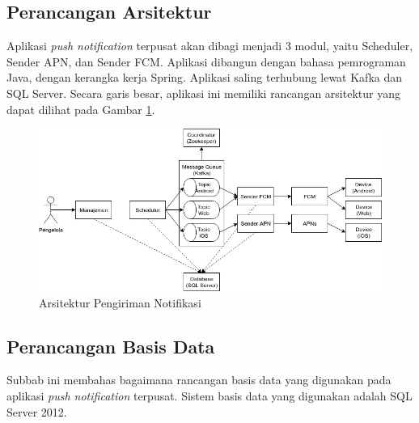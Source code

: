 \subsection{Perancangan Arsitektur} \label{s:perancangan_arsitektur}
\par Aplikasi \textit{push notification} terpusat akan dibagi menjadi 3 modul, yaitu Scheduler,
Sender APN, dan Sender FCM.
Aplikasi dibangun dengan bahasa pemrograman Java, dengan kerangka kerja
Spring.
Aplikasi saling terhubung lewat Kafka dan SQL Server.
Secara garis besar, aplikasi ini memiliki rancangan
arsitektur yang dapat dilihat pada Gambar \ref{f:arsitektur_aplikasi}.
\begin{figure}[H]
	\caption{Arsitektur Pengiriman Notifikasi} \label{f:arsitektur_aplikasi}
    \includegraphics[width=1\textwidth]{bab3/figures/arsitektur_pengiriman_notifikasi.jpg}
\end{figure}

\subsection{Perancangan Basis Data}
\par Subbab ini membahas bagaimana rancangan basis data yang digunakan pada aplikasi \textit{push notification} terpusat. Sistem basis data yang digunakan adalah SQL Server 2012.

